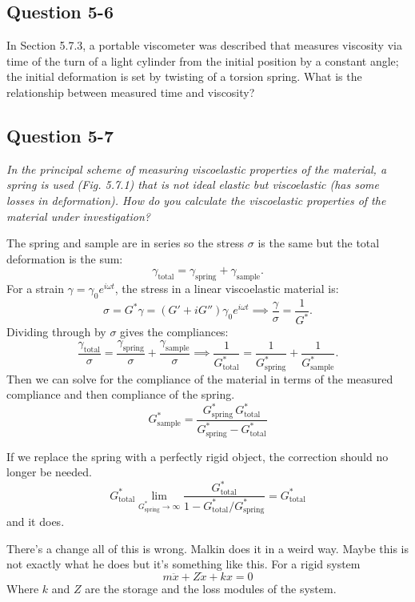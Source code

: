 \subsection*{Question 5-6}
In Section 5.7.3, a portable viscometer was described that measures viscosity via time of the turn of a light cylinder from the initial position by a constant angle; the initial deformation is set by twisting of a torsion spring. What is the relationship between measured time and viscosity?

\subsection*{Question 5-7}
\textit{In the principal scheme of measuring viscoelastic properties of the material, a spring is used (Fig. 5.7.1) that is not ideal elastic but viscoelastic (has some losses in deformation). How do you calculate the viscoelastic properties of the material under investigation?}

The spring and sample are in series so the stress $\sigma$ is the same but the total deformation is the sum:
\[
	\gamma_\text{total} = \gamma_\text{spring} + \gamma_\text{sample}.
\]
For a strain $\gamma = \gamma_0 e^{i\omega t}$, the stress in a linear viscoelastic material is:
\[
	\sigma = G^* \gamma = (G' + iG'')\gamma_0 e^{i\omega t} \implies 
	\frac{\gamma}{\sigma} = \frac{1}{G^*}.
\]
Dividing through by $\sigma$ gives the compliances:
\[
	\frac{\gamma_\text{total}}{\sigma} = \frac{\gamma_\text{spring}}{\sigma} + \frac{\gamma_\text{sample}}{\sigma}
	\implies
	\frac{1}{G^*_\text{total}} = \frac{1}{G^*_\text{spring}} + \frac{1}{G^*_\text{sample}}.
\]
Then we can solve for the compliance of the material in terms of the measured compliance and then compliance of the spring.
\begin{equation}
	G^*_{\text{sample}} = \frac{G^*_{\text{spring}}\, G^*_\text{total}}{G^*_{\text{spring}} - G^*_\text{total}}
\end{equation}

If we replace the spring with a perfectly rigid object, the correction should no longer be needed.
\begin{equation}
	G^*_\text{total}
	\lim_{G^*_{\text{spring}} \to\infty}
	\frac{G^*_\text{total}}{1 - G^*_\text{total}/ G^*_{\text{spring}}} = 
	G^*_\text{total}
\end{equation}
and it does.

There's a change all of this is wrong.
Malkin does it in a weird way.
Maybe this is not exactly what he does but it's something like this.
For a rigid system
\[
	m\ddot x + Z \dot x + k x = 0
\]
Where $k$ and $Z$ are the storage and the loss modules of the system.




